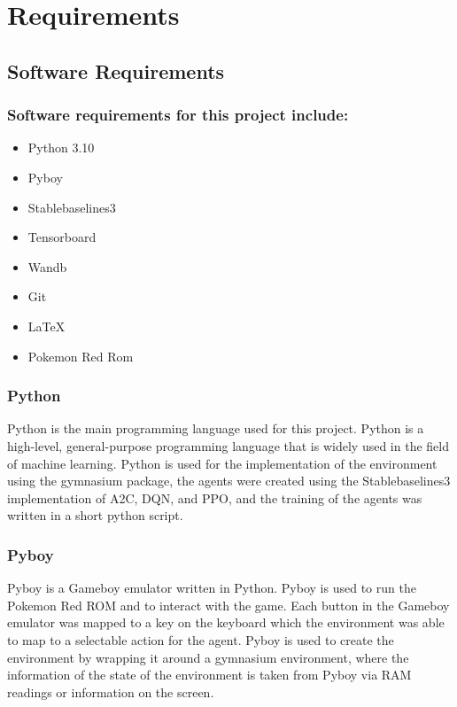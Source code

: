 \section{Requirements}

\subsection{Software Requirements}

\subsubsection*{Software requirements for this project include:}


\begin{itemize}
    \item Python 3.10
    \item Pyboy
    \item Stablebaselines3
    \item Tensorboard
    \item Wandb
    \item Git
    \item LaTeX
    \item Pokemon Red Rom
\end{itemize}

\subsubsection*{Python}
Python is the main programming language used for this project. Python is a high-level, general-purpose programming language that is widely used in the field of machine learning. Python is used for the implementation of the environment using the gymnasium package, the agents were created using the Stablebaselines3 implementation of A2C, DQN, and PPO, and the training of the agents was written in a short python script.

\subsubsection*{Pyboy}
Pyboy is a Gameboy emulator written in Python. Pyboy is used to run the Pokemon Red ROM and to interact with the game. Each button in the Gameboy emulator was mapped to a key on the keyboard which the environment was able to map to a selectable action for the agent. Pyboy is used to create the environment by wrapping it around a gymnasium environment, where the information of the state of the environment is taken from Pyboy via RAM readings or information on the screen.

